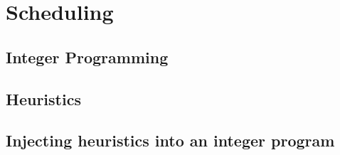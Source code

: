 \section{Scheduling}

\subsection{Integer Programming}

\subsection{Heuristics}

\subsection{Injecting heuristics into an integer program}


